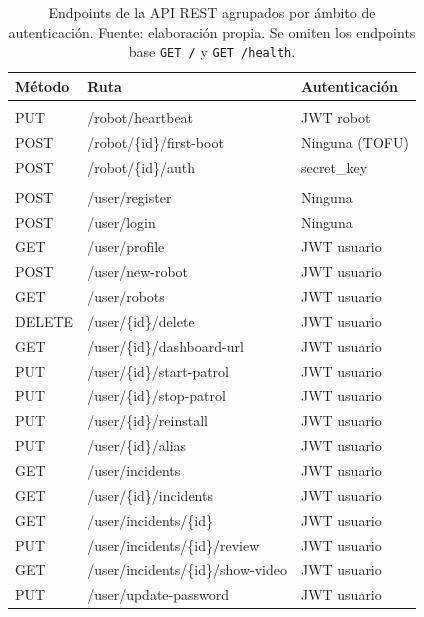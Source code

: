 \begin{table}[htbp]
  \centering
  \small
  \caption[Endpoints de la API REST]{Endpoints de la API REST agrupados por ámbito
  de autenticación. Fuente: elaboración propia. Se omiten los endpoints base
  \texttt{GET /} y \texttt{GET /health}.}
  \label{tab:endpoints}
  \begin{tabular}{@{}>{\ttfamily}l >{\ttfamily}l l@{}}
    \toprule
    \textbf{\normalfont Método} & \textbf{\normalfont Ruta} &
    \textbf{Autenticación} \\
    \midrule
    \multicolumn{3}{@{}l}{\textit{Ámbito robot}} \\
    PUT    & /robot/heartbeat        & JWT robot \\
    POST   & /robot/\{id\}/first-boot & Ninguna (TOFU) \\
    POST   & /robot/\{id\}/auth       & secret\_key \\
    \midrule
    \multicolumn{3}{@{}l}{\textit{Ámbito usuario}} \\
    POST   & /user/register          & Ninguna \\
    POST   & /user/login             & Ninguna \\
    GET    & /user/profile           & JWT usuario \\
    POST   & /user/new-robot         & JWT usuario \\
    GET    & /user/robots            & JWT usuario \\
    DELETE & /user/\{id\}/delete       & JWT usuario \\
    GET    & /user/\{id\}/dashboard-url & JWT usuario \\
    PUT    & /user/\{id\}/start-patrol  & JWT usuario \\
    PUT    & /user/\{id\}/stop-patrol   & JWT usuario \\
    PUT    & /user/\{id\}/reinstall     & JWT usuario \\
    PUT    & /user/\{id\}/alias         & JWT usuario \\
    GET    & /user/incidents         & JWT usuario \\
    GET    & /user/\{id\}/incidents    & JWT usuario \\
    GET    & /user/incidents/\{id\}    & JWT usuario \\
    PUT    & /user/incidents/\{id\}/review & JWT usuario \\
    GET    & /user/incidents/\{id\}/show-video & JWT usuario \\
    PUT    & /user/update-password   & JWT usuario \\

\end{tabular}
\end{table}
